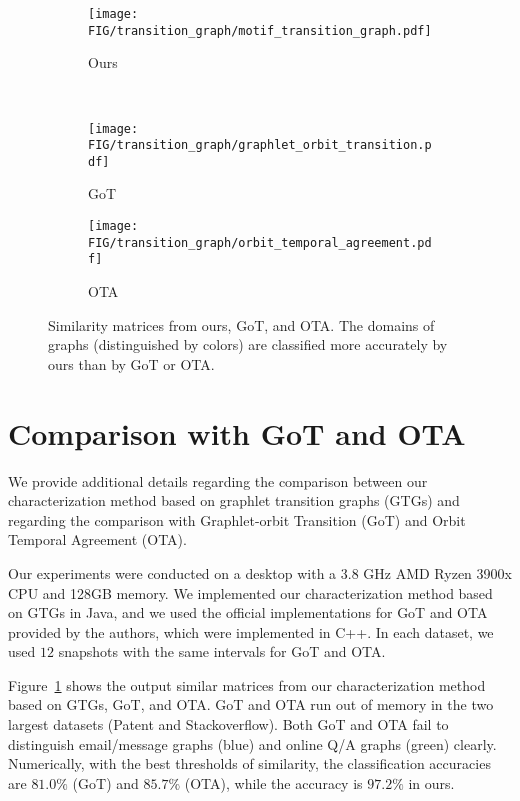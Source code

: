 \begin{figure}[t]
    \begin{subfigure}{0.24\textwidth}
        \texttt{[image: FIG/transition\_graph/motif\_transition\_graph.pdf]}
        \caption{Ours}
    \end{subfigure} \\
    \begin{subfigure}{0.22\textwidth}
        \texttt{[image: FIG/transition\_graph/graphlet\_orbit\_transition.pdf]}
        \caption{GoT}
    \end{subfigure}
    \begin{subfigure}{0.22\textwidth}
        \texttt{[image: FIG/transition\_graph/orbit\_temporal\_agreement.pdf]}
        \caption{OTA}
    \end{subfigure}
    \caption{\label{fig:got_sim}Similarity matrices from ours, GoT, and OTA.
    The domains of graphs (distinguished by colors) are classified more accurately by ours than by GoT or OTA.}
\end{figure}

\appendix
\section{Comparison with GoT and OTA}
\label{sec:appendix:compare_got_ota}
We provide additional details regarding the comparison between our characterization method based on graphlet transition graphs (GTGs) and regarding the comparison with Graphlet-orbit Transition (GoT) and Orbit Temporal Agreement (OTA).

 Our experiments were conducted on a desktop with a 3.8 GHz AMD Ryzen 3900x CPU and 128GB memory. We implemented our characterization method based on GTGs in Java, and we used the official implementations for GoT and OTA provided by the authors, which were implemented in C++. In each dataset, we used $12$ snapshots with the same intervals for GoT and OTA. 

 Figure~\ref{fig:got_sim} shows the output similar matrices from our characterization method based on GTGs, GoT, and OTA.
GoT and OTA run out of memory in the two largest datasets (Patent and Stackoverflow). %
Both GoT and OTA fail to distinguish email/message graphs (blue) and online Q/A graphs (green) clearly. Numerically, with the best thresholds of similarity, the classification accuracies are $81.0\%$ (GoT) and $85.7\%$ (OTA), while the accuracy is $97.2\%$ in ours.



